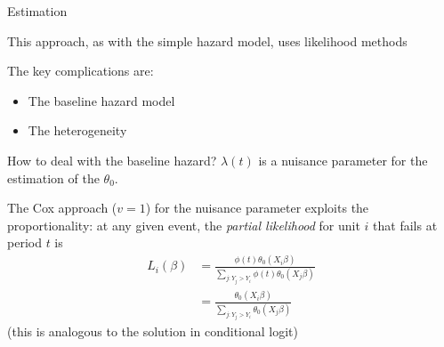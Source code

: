 \documentclass[notes,11pt, aspectratio=169]{beamer}
\newenvironment{wideitemize}{\itemize\addtolength{\itemsep}{10pt}}{\enditemize}
\begin{document}
\begin{frame}{Estimation}
  \begin{wideitemize}
  \item This approach, as with the simple hazard model, uses likelihood methods
  \item The key complications are:
    \begin{itemize}
    \item The baseline hazard model
    \item The heterogeneity
    \end{itemize}
  \item How to deal with the baseline hazard? $\lambda(t)$ is a
    nuisance parameter for the estimation of the $\theta_{0}$.
  \item The Cox approach ($v = 1$) for the nuisance parameter
    exploits the proportionality: at any given event, the
    \emph{partial likelihood} for unit $i$ that fails at period
    $t$ is
    \begin{align*}
      L_{i}(\beta) &= \frac{\phi(t)\theta_0(X_{i}\beta)}{\sum_{j : Y_{j} > Y_{i}} \phi(t)\theta_0(X_{j}\beta)}\\
                   &= \frac{\theta_0(X_{i}\beta)}{\sum_{j: Y_{j} > Y_{i}} \theta_0(X_{j}\beta)}
    \end{align*}
    (this is analogous to the solution in conditional logit)
  \end{wideitemize}
\end{frame}
\end{document}
